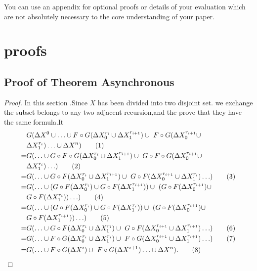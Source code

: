 \begin{appendix}
You can use an appendix for optional proofs or details of your evaluation which are not absolutely necessary to the core understanding of your paper.
\section{proofs}
\subsection{Proof of Theorem Asynchronous}
 \begin{proof}
 \label{sec:app:proof:correct}
 In this section .Since $X$ has been divided into two disjoint set. we exchange the subset belongs to any two adjacent recursion,and the prove that they have the same formula.It
 \begin{align}
 &G(\Delta X^0\cup \ldots \cup F\circ G(\Delta X^{r_i}_0 \cup \Delta X^{r_{i+1}}_1)\cup\ F\circ G(\Delta X^{r_{i+1}}_0 \cup \notag\\ &\Delta X^{r_i}_1) \ldots\cup \Delta X^n)\tag{1} \\
 =&G( \ldots \cup G \circ F\circ G(\Delta X^{r_i}_0 \cup \Delta X^{r_{i+1}}_1)\cup\ G \circ F\circ G(\Delta X^{r_{i+1}}_0 \cup \notag\\ &\Delta X^{r_i}_1) \ldots)\tag{2} \\
 =&G( \ldots \cup G \circ F(\Delta X^{r_i}_0 \cup \Delta X^{r_{i+1}}_1)\cup\ G \circ F(\Delta X^{r_{i+1}}_0 \cup \Delta X^{r_{i}}_1) \ldots)\tag{3} \\
  =&G( \ldots \cup (G\circ F(\Delta X^{r_i}_0) \cup G\circ F(\Delta X^{r_{i+1}}_1))\cup\ (G \circ F(\Delta X^{r_{i+1}}_0) \cup \notag\\ &G \circ F(\Delta X^{r_i}_1)) \ldots )\tag{4} \\
  =&G( \ldots \cup (G\circ F(\Delta X^{r_i}_0) \cup G\circ F(\Delta X^{r_i}_1))\cup\ (G \circ F(\Delta X^{r_{i+1}}_0) \cup \notag\\ &G \circ F(\Delta X^{r_{i+1}}_1)) \ldots )\tag{5} \\
  =&G( \ldots \cup G \circ F(\Delta X^{r_i}_0 \cup \Delta X^{r_{i}}_1)\cup\ G \circ F(\Delta X^{r_{i+1}}_0 \cup \Delta X^{r_{i+1}}_1) \ldots)\tag{6} \\
  =&G( \ldots \cup F \circ G(\Delta X^{r_i}_0 \cup \Delta X^{r_{i}}_1)\cup\ F \circ G(\Delta X^{r_{i+1}}_0 \cup \Delta X^{r_{i+1}}_1) \ldots)\tag{7} \\
=&G(\ldots \cup F \circ G(\Delta X^i)\cup\ F \circ G(\Delta X^{i+1}) \ldots\cup \Delta X^n).\tag{8}
 \end{align}


\end{proof}
\end{appendix}
